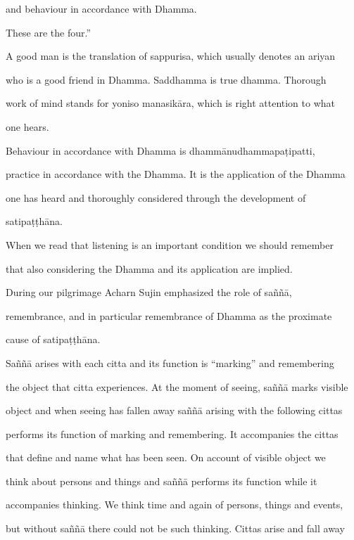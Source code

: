       and behaviour in accordance with Dhamma. 

         These are the four.” 



 A good man is the translation of sappurisa, which usually denotes an ariyan  

who   is  a  good  friend  in  Dhamma.  Saddhamma  is  true  dhamma.  Thorough  

work of mind  stands for yoniso manasikāra, which  is right  attention to what  

one hears. 

   Behaviour   in   accordance   with   Dhamma   is   dhammānudhammapaṭipatti,  

practice in accordance with the Dhamma. It is the application of the Dhamma  

one   has   heard   and   thoroughly   considered   through   the   development   of  

satipaṭṭhāna. 

   When we read that listening is an important condition we should remember  

that also considering the Dhamma and its application are implied. 



During   our   pilgrimage   Acharn   Sujin   emphasized   the   role   of   saññā,  

remembrance,  and  in  particular  remembrance  of  Dhamma  as  the  proximate  

cause of satipaṭṭhāna. 

   Saññā arises with each citta and its function is “marking” and remembering  

the object that citta experiences. At the moment of seeing, saññā marks visible  

object and when seeing has fallen away saññā arising with the following cittas  

performs its function of marking and remembering. It accompanies the cittas  

that  define  and  name what  has been  seen.  On  account  of visible  object we  

think   about   persons   and   things   and   saññā   performs   its   function   while   it  

accompanies thinking. We think time and again of persons, things and events,  

but without saññā there could not be such thinking. Cittas arise and fall away  


